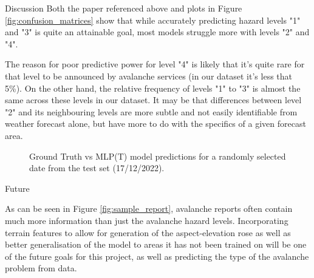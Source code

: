 \documentclass[final]{beamer}
\newlength{\colwidth}
\begin{document}
\begin{frame}[t]
\begin{columns}[t]
\begin{column}{\colwidth}
\begin{block}{Discussion}
    Both the paper referenced above and plots in Figure \ref{fig:confusion_matrices} show that while accurately predicting hazard levels  "1" and "3" is quite an attainable goal, most models struggle more with levels "2" and "4". 

    The reason for poor predictive power for level "4" is likely that it's quite rare for that level to be announced by avalanche services (in our dataset it's less that 5\%). On the other hand, the relative frequency of levels "1" to "3" is almost the same across these levels in our dataset. It may be that differences between level "2" and its neighbouring levels are more subtle and not easily identifiable from weather forecast alone, but have more to do with the specifics of a given forecast area.

\begin{figure}[htbp]
    \centering
        \centering
    \caption{Ground Truth vs MLP(T) model predictions for a randomly selected date from the test set (17/12/2022).}
    \label{fig:sample_prediction}
\end{figure}
    
  \end{block}

  \begin{block}{Future}


	As can be seen in Figure \ref{fig:sample_report}, avalanche reports often contain much more information than just the avalanche hazard levels. Incorporating terrain features to allow for generation of the aspect-elevation rose as well as better generalisation of the model to areas it has not been trained on will be one of the future goals for this project, as well as predicting the type of the avalanche problem from data.


\end{block}
\end{column}
\end{columns}
\end{frame}
\end{document}
